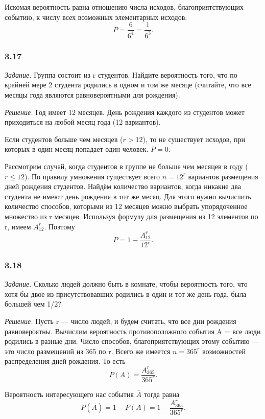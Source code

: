 \documentclass{book}
\begin{document}
Искомая вероятность равна отношению числа исходов, благоприятствующих событию, к числу всех возможных элементарных исходов:
$$ P =
\frac{6}{6^4} = \frac{1}{6^3}.$$

\subsubsection*{3.17}

\textit{Задание.} Группа состоит из r студентов.
Найдите вероятность того, что по крайней мере 2 студента родились в одном и том же месяце (считайте, что все месяцы года являются равновероятными для рождения).

\textit{Решение.} Год имеет 12 месяцев.
День рождения каждого из студентов может приходиться на любой месяц года (12 вариантов).

Если студентов больше чем месяцев ($ r > 12 $), то не существует исходов, при которых в один месяц попадает один человек.
$ P = 0 $.

Рассмотрим случай, когда студентов в группе не больше чем месяцев в году ($ r \leq 12 $).
По правилу умножения существует всего $ n = 12^r $ вариантов размещения дней рождения студентов.
Найдём количество вариантов, когда никакие два студента не имеют день рождения в тот же месяц.
Для этого нужно вычислить количество способов, которыми из 12 месяцев можно выбрать упорядоченное множество из r месяцев.
Используя формулу для размещения из 12 элементов по r, имеем $ A_{12}^r $.
Поэтому
$$ P =
1 - \frac{ A_{ 12 }^r }{ 12^r }.$$

\subsubsection*{3.18}

\textit{Задание.} Сколько людей должно быть в комнате, чтобы вероятность того, что хотя бы двое из присутствовавших родились в один и тот же день года, была большей чем 1/2?

\textit{Решение.} Пусть r --- число людей, и будем считать, что все дни рождения равновероятны.
Вычислим вероятность противоположного события A = {все люди родились в разные дни}.
Число способов, благоприятствующих этому событию --- это число размещений из 365 по r.
Всего же имеется $ n = 365^r $ возможностей распределения дней рождения.
То есть
$$ P(A) =
\frac{A_{365}^r}{365^r}.$$

Вероятность интересующего нас события $ \overline{A} $ тогда равна
$$ P \left( \overline{A} \right) =
1 - P \left( A \right) =
1 - \frac{A_{365}^r}{365^r}.$$
\end{document}
